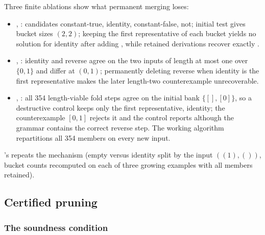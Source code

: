 Three finite ablations show what permanent merging loses:
\begin{itemize}
\item {}, : candidates constant-true, identity, constant-false, not; initial test  gives bucket sizes $(2,2)$; keeping the first representative of each bucket yields no solution for identity after adding , while retained derivations recover exactly .
\item {}, : identity and reverse agree on the two inputs of length at most one over $\{0,1\}$ and differ at $(0,1)$; permanently deleting reverse when identity is the first representative makes the later length-two counterexample unrecoverable.
\item {}, : all 354 length-viable fold steps agree on the initial bank $\{[],[0]\}$, so a destructive control keeps only the first representative, identity; the counterexample $[0,1]$ rejects it and the control reports  although the grammar contains the correct reverse step. The working algorithm repartitions all 354 members on every new input.
\end{itemize}
's  repeats the mechanism (empty versus identity split by the input $((1),())$, bucket counts recomputed on each of three growing examples with all members retained).

\subsection{Certified pruning}\label{alg:pruning}

\subsubsection{The soundness condition}

